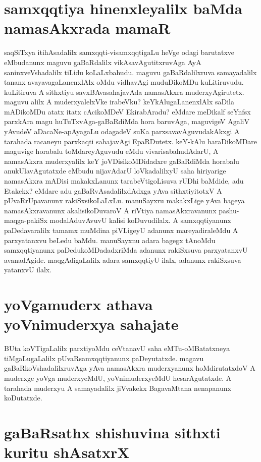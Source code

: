 \section*{samxqqtiya hinenxleyalilx baMda namasAkxrada mamaR}

saqSiTxya itihAsadalilx samxqqti-visamxqqtigaLu heVge odagi barutatxve eMbudanunx maguvu gaBaRdalilx vikAsavAgutitxruvAga AyA saninxveVshadalilx tiLidu koLaLxbahudu. maguvu gaBaRdalilxruva samayadalilx tananx avayavagaLanenxlAlx oMdu vidhavAgi muduDikoMDu kuLitiruvudu. kuLitiruva A sithxtiyu savxBAvasahajavAda namasAkxra muderxyAgirutetx. maguvu alilx A muderxyalelxVke irabeVku? keYkAlugaLanenxlAlx saDila mADikoMDu atatx itatx cAcikoMDeV EkirabAradu? eMdare meDikalf seYnfsx  parxkAra magu huTuTxvAga-gaBaRdiMda hora baruvAga, maguvigeV AgaliV yAvudeV aDacaNe-apAyagaLu odagadeV suKa parxsavavAguvudakAkxgi A tarahada racaneyu parxkaqti sahajavAgi EpaRDutetx. keY-kAlu haraDikoMDare maguvige horabalu toMdareyAguvudu eMdu vivarisabahudAdarU, A namasAkxra muderxyalilx keY joVDisikoMDidadxre
gaBaRdiMda horabalu anukUlavAgutatxde eMbudu nijavAdarU loVkadalilxyU saha hiriyarige namasAkxra mADisi makakxLanunx tarabeVtigoLisuva rUDhi baMdide, adu Etakekx? eMdare adu gaBaRvAsadalilxdAdxga yAva sithxtiyitotxV A pUvaRrUpavanunx rakiSxsikoLaLxLu. manuSayxru makakxLige yAva bageya namasAkxravanunx akalisikoDuvaroV A riVtiya namasAkxravanunx pashu-maqga-pakiSx modalAduvAvuvU kalisi koDuvudilalx. A samxqqtiyanunx paDedavaralilx tamamx muMdina piVLigeyU adanunx mareyadiraleMdu A parxyatanxvu beLedu baMdu. manuSayxnu adara bagegx tAnoMdu samxqqtiyanunx paDedukoMDadadxriMda adanunx rakiSxsuva parxyatanxvU avanadAgide. maqgAdigaLalilx adara samxqqtiyU ilalx, adanunx rakiSxsuva yatanxvU ilalx.

\section*{yoVgamuderx athava yoVnimuderxya sahajate}

BUta koVTigaLalilx parxtiyoMdu ceVtanavU saha eMTu-oMBatatxneya tiMgaLugaLalilx pUvaRsamxqqtiyanunx paDeyutatxde. magavu gaBaRkoVshadalilxruvAga yAva namasAkxra muderxyanunx hoMdirutatxdoV A muderxge yoVga muderxyeMdU, yoVnimuderxyeMdU hesarAgutatxde. A tarahada muderxyu A samayadalilx jiVvakekx BagavaMtana nenapanunx koDutatxde. 

\section*{gaBaRsathx shishuvina sithxti kuritu shAsatxrX}


